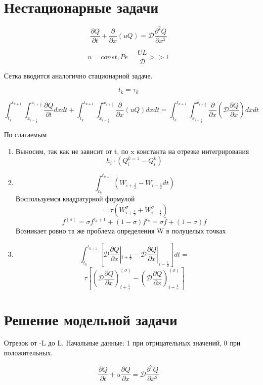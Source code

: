 \documentclass[14pt]{extarticle}
\begin{document}
\section{Нестационарные задачи}

\[ \frac{\partial Q}{\partial t} + \frac{\partial }{\partial x }(u Q) = \mathcal{D} \frac{\partial^2 Q }{\partial x^2 } \]

\[ u = const, {Pe} = \frac{U L }{\mathcal{D}} >> 1 \]

Сетка вводится аналогично стационарной задаче.

\[ t_k = \tau_k \]

\[ \int_{t_k }^{t_{k+1}}\int_{x_{i-\frac{1}{2}}}^{x_{i+\frac{1}{2}}} \frac{\partial Q }{\partial t} dx dt + \int_{t_k }^{t_{k+1}}\int_{x_{i-\frac{1}{2}}}^{x_{i+\frac{1}{2}}} \frac{\partial}{\partial x} (u Q) dx dt = \int_{t_k }^{t_{k+1}}\int_{x_{i-\frac{1}{2}}}^{x_{i+\frac{1}{2}}} \frac{\partial}{\partial x} (\mathcal{D} \frac{\partial Q }{\partial x }) dx dt \]

По слагаемым
\begin{enumerate}
	\item Выносим, так как не зависит от t, по x константа на отрезке интегрирования
	\[ h_i \cdot (Q^{k=1}_i - Q^k_i) \]
	\item \[ \int_{t_k }^{t_{k+1}}(W_{i+\frac{1}{2}} - W_{i-\frac{1}{2}} dt ) \]
	Воспользуемся квадратурной формулой
	\[ = \tau (W^{\sigma}_{i+\frac{1}{2}} + W^{\sigma}_{i-\frac{1}{2}}) \]
	\[ f^{(\sigma)} = \sigma f^{t_k + 1} + (1-\sigma) f^{t_k} = \sigma \hat{f} + (1-\sigma) f \]
	Возникает ровно та же проблема определения W в полуцелых точках
	\item
	\[ \int_{t_k }^{t_{k+1}} [ \mathcal{D} \frac{\partial Q }{\partial x} |_{i+\frac{1}{2}} - \mathcal{D} \frac{\partial Q }{\partial x} |_{i-\frac{1}{2}}] dt = \]
	\[ \tau [(\mathcal{D} \frac{\partial Q }{\partial x})_{i+\frac{1}{2}}^{(\sigma)} - (\mathcal{D} \frac{\partial Q }{\partial x})_{i-\frac{1}{2}}^{(\sigma)}] \]
\end{enumerate}

\section{Решение модельной задачи}

Отрезок от -L до L. Начальные данные: 1 при отрицательных значений, 0 при положительных.

\[ \frac{\partial Q }{\partial t } + u \frac{\partial Q }{\partial x} = \mathcal{D} \frac{\partial^2 Q }{\partial x^2} \]
\end{document}
